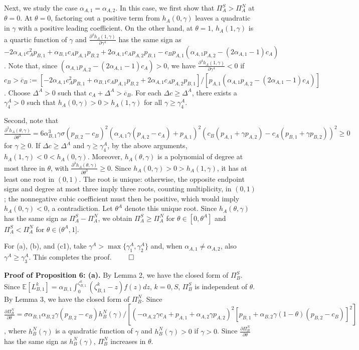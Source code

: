 \documentclass[nonblindrev,copyedit]{informs1}
\begin{document}
\begin{APPENDICES}
Next, we study the case $\alpha_{A,1}=\alpha_{A,2}$. In this case, we first show that $\Pi^S_A > \Pi^N_A $ at $\theta = 0$. At $\theta=0$, factoring out a positive term from $h_A(0,\gamma)$ leaves a quadratic in $\gamma$ with a positive leading coefficient. On the other hand, at $\theta = 1$, $h_A(1,\gamma)$ is a quartic function of $\gamma$ and $\frac{\partial^4 h_A(1,\gamma)}{\partial \gamma^4} $ has the same sign as $-2 \alpha_{A,1}  c_{A}^2 p_{B,1}+\alpha_{B,1} c_{A} p_{A,1} p_{B,2}+2 \alpha_{A,1}  c_{A} p_{A,2} p_{B,1} - c_B p_{A,1} (\alpha_{A,1} p_{A,2}-(2 \alpha_{A,1} -1) c_A)$. Note that, since $(\alpha_{A,1} p_{A,2}-(2 \alpha_{A,1} -1) c_A) > 0$, we have $\frac{\partial^4 h_A(1,\gamma)}{\partial \gamma^4} <0$ if $c_B > \overline{c}_B := [-2 \alpha_{A,1}  c_{A}^2 p_{B,1}+\alpha_{B,1} c_{A} p_{A,1} p_{B,2}+2 \alpha_{A,1}  c_{A} p_{A,2} p_{B,1}]/[p_{A,1} (\alpha_{A,1} p_{A,2}-(2 \alpha_{A,1} -1) c_A)]$. Choose $\Delta^A>0$ such that $c_A+\Delta^A>\overline{c}_B$. For each $\Delta c\geq\Delta^A$, there exists a $\gamma^A_4>0$ such that $h_A(0,\gamma)>0>h_A(1,\gamma)$ for all $\gamma\geq\gamma^A_4$.

Second, note that $\frac{\partial^3 h_A(\theta, \gamma)}{\partial \theta^3} = 6 \alpha_{B,1}^3 \gamma  \sigma  (p_{B,2}-c_B)^2 (\alpha_{A,1}  \gamma  (p_{A,2}-c_A)+p_{A,1})^2 (c_B (p_{A,1}+\gamma  p_{A,2})-c_A (p_{B,1}+\gamma  p_{B,2}))^2 \geq 0$
for $\gamma \geq 0$. If $\Delta c \geq \Delta^A$ and $\gamma \geq \gamma^A_4$, by the above arguments, $h_A(1,\gamma) < 0 < h_A(0,\gamma)$.  Moreover, $h_A(\theta,\gamma)$ is a polynomial of degree at most three in $\theta$, with $\frac{\partial^3 h_A(\theta,\gamma)}{\partial \theta^3} \geq 0$. Since $h_A(0,\gamma)>0>h_A(1,\gamma)$, it has at least one root in $(0,1)$. The root is unique: otherwise, the opposite endpoint signs and degree at most three imply three roots, counting multiplicity, in $(0,1)$; the nonnegative cubic coefficient must then be positive, which would imply $h_A(0,\gamma)<0$, a contradiction. Let $\theta^A$ denote this unique root. Since $h_A(\theta,\gamma)$ has the same sign as $\Pi_A^S-\Pi_A^N$, we obtain $\Pi_A^S\geq\Pi_A^N$ for $\theta\in[0,\theta^A]$ and $\Pi_A^S<\Pi_A^N$ for $\theta\in(\theta^A,1]$.

For (a), (b), and (c1), take $\gamma^A>\max\{\gamma^A_1,\gamma^A_2\}$ and, when $\alpha_{A,1}\ne\alpha_{A,2}$, also $\gamma^A\geq\gamma^A_3$. This completes the proof. $\qed$

{\bf Proof of Proposition 6: (a).} By Lemma 2, we have the closed form of $\Pi^S_B$. Since $\mathbb{E} [L^k_{B,1}] =\alpha_{B,1} \int_{0}^{\zeta^k_{B,1}} (\zeta^k_{B,1} - z) f(z) dz$, $k = 0, S$,
$\Pi^S_B$ is independent of $\theta$. By Lemma 3, we have the closed form of $\Pi^N_B$. Since $\frac{\partial \Pi^N_B}{\partial \theta} = \sigma \alpha_{B,1} \alpha_{B,2} \gamma (p_{B,2} - c_B) h^N_B(\gamma) /[(-\alpha_{A,2} \gamma  c_A+p_{A,1}+\alpha_{A,2} \gamma  p_{A,2})^2 [p_{B,1}+\alpha_{B,2} \gamma  (1-\theta) (p_{B,2}-c_B)]^2]$, where $h^N_B(\gamma)$ is a quadratic function of $\gamma$
and $h^N_B(\gamma) >0$ if $\gamma > 0$. Since $\frac{\partial \Pi^N_B}{\partial \theta}$ has the same sign as $h^N_B(\gamma)$, $\Pi^N_B$ increases in $\theta$.


\end{APPENDICES}
\end{document}

